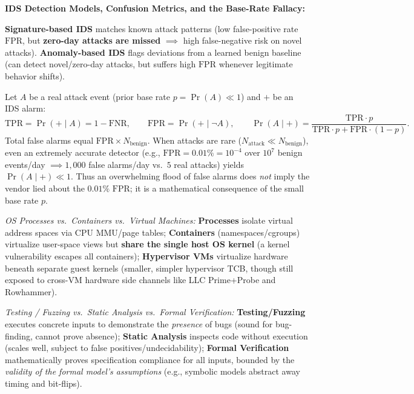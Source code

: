 \textbf{IDS Detection Models, Confusion Metrics, and the Base-Rate Fallacy:}
\begin{compactitem}
  \item {} \textbf{Signature-based IDS} matches known attack patterns (low false-positive rate $\mathrm{FPR}$, but \textbf{zero-day attacks are missed} $\implies$ high false-negative risk on novel attacks). \textbf{Anomaly-based IDS} flags deviations from a learned benign baseline (can detect novel/zero-day attacks, but suffers high $\mathrm{FPR}$ whenever legitimate behavior shifts).
  \item {} Let $A$ be a real attack event (prior base rate $p = \Pr(A) \ll 1$) and $+$ be an IDS alarm:
  \[
    \mathrm{TPR} = \Pr(+\mid A) = 1 - \mathrm{FNR}, \qquad \mathrm{FPR} = \Pr(+\mid \neg A), \qquad
    \Pr(A \mid +) = \frac{\mathrm{TPR} \cdot p}{\mathrm{TPR} \cdot p + \mathrm{FPR} \cdot (1 - p)}.
  \]
   Total false alarms equal $\mathrm{FPR} \times N_{\text{benign}}$. When attacks are rare ($N_{\text{attack}} \ll N_{\text{benign}}$), even an extremely accurate detector (e.g., $\mathrm{FPR} = 0.01\% = 10^{-4}$ over $10^7$ benign events/day $\implies 1{,}000$ false alarms/day vs.\ $5$ real attacks) yields $\Pr(A \mid +) \ll 1$. Thus an overwhelming flood of false alarms does \emph{not} imply the vendor lied about the $0.01\%$ $\mathrm{FPR}$; it is a mathematical consequence of the small base rate $p$.
  \item {}
  \begin{compactitem}
    \item \emph{OS Processes vs.\ Containers vs.\ Virtual Machines:} \textbf{Processes} isolate virtual address spaces via CPU MMU/page tables; \textbf{Containers} (namespaces/cgroups) virtualize user-space views but \textbf{share the single host OS kernel} (a kernel vulnerability escapes all containers); \textbf{Hypervisor VMs} virtualize hardware beneath separate guest kernels (smaller, simpler hypervisor TCB, though still exposed to cross-VM hardware side channels like LLC Prime+Probe and Rowhammer).
    \item \emph{Testing / Fuzzing vs.\ Static Analysis vs.\ Formal Verification:} \textbf{Testing/Fuzzing} executes concrete inputs to demonstrate the \emph{presence} of bugs (sound for bug-finding, cannot prove absence); \textbf{Static Analysis} inspects code without execution (scales well, subject to false positives/undecidability); \textbf{Formal Verification} mathematically proves specification compliance for all inputs, bounded by the \emph{validity of the formal model's assumptions} (e.g., symbolic models abstract away timing and bit-flips).
  \end{compactitem}
\end{compactitem}

